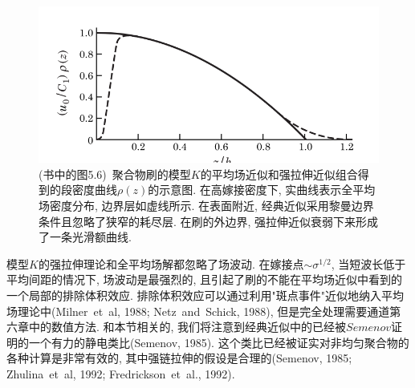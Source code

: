 \label{subsec.figure}
\begin{figure}[htbp]
    \centering
    \centerline{\includegraphics[scale=0.4]{./Contents/chapter5/figures/fig6.png}}
    \caption{(书中的图5.6)\
    聚合物刷的模型$K$的平均场近似和强拉伸近似组合得到的段密度曲线$\rho(z)$的示意图.
    在高嫁接密度下, 实曲线表示全平均场密度分布, 边界层如虚线所示. 在表面附近,
    经典近似采用黎曼边界条件且忽略了狭窄的耗尽层. 在刷的外边界,
    强拉伸近似衰弱下来形成了一条光滑额曲线.}
	\label{fig.3}
\end{figure}



\par
模型$K$的强拉伸理论和全平均场解都忽略了场波动. 在嫁接点$\sim\sigma^{1/2}$, 当短波长低于平均间距的情况下,
场波动是最强烈的, 且引起了刷的不能在平均场近似中看到的一个局部的排除体积效应.
排除体积效应可以通过利用"斑点事件"近似地纳入平均场理论中(Milner\ et\ al, 1988;
Netz\ and\ Schick, 1988), 但是完全处理需要通道第六章中的数值方法. 和本节相关的,
我们将注意到经典近似中的已经被$Semenov$证明的一个有力的静电类比(Semenov,
1985). 这个类比已经被证实对非均匀聚合物的各种计算是非常有效的,
其中强链拉伸的假设是合理的(Semenov, 1985; Zhulina\ et\ al, 1992; Fredrickson\
et\ al., 1992).




